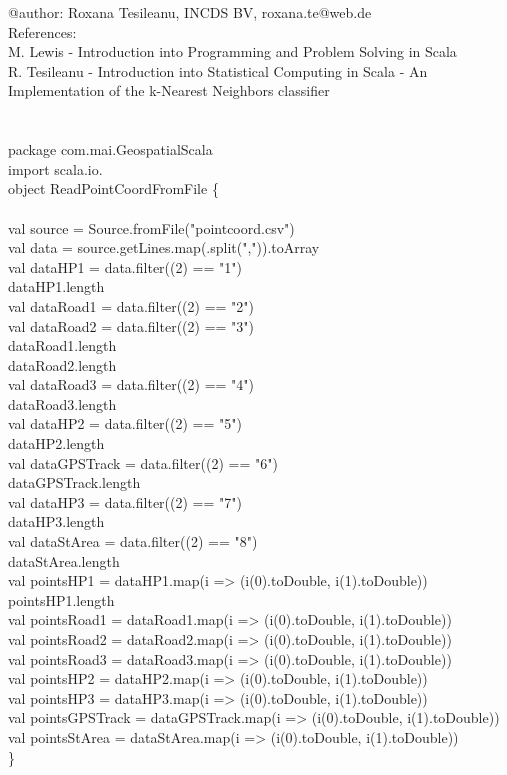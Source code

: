 \documentclass {article}
\begin{document}
\begin{appendices}
@author: Roxana Tesileanu, INCDS BV, roxana.te@web.de\\
References:\\ 
M. Lewis - Introduction into Programming and Problem Solving in Scala\\
R. Tesileanu - Introduction into Statistical Computing in Scala - An Implementation of the k-Nearest Neighbors classifier\\
\\
\\
package com.mai.GeospatialScala\\
import scala.io.\underline{\space}\\
object ReadPointCoordFromFile \{ 
\\
\\
val source = Source.fromFile("pointcoord.csv")\\
val data = source.getLines.map(\underline{\space}.split(",")).toArray\\
val dataHP1 = data.filter(\underline{\space}(2) == "1")\\
dataHP1.length\\
val dataRoad1 = data.filter(\underline{\space}(2) == "2")\\
val dataRoad2 = data.filter(\underline{\space}(2) == "3")\\
dataRoad1.length\\
dataRoad2.length\\
val dataRoad3 = data.filter(\underline{\space}(2) == "4")\\
dataRoad3.length\\
val dataHP2 = data.filter(\underline{\space}(2) == "5")\\
dataHP2.length\\
val dataGPSTrack = data.filter(\underline{\space}(2) == "6")\\
dataGPSTrack.length\\
val dataHP3 = data.filter(\underline{\space}(2) == "7")\\
dataHP3.length\\
val dataStArea =  data.filter(\underline{\space}(2) == "8")\\
dataStArea.length\\
val pointsHP1 = dataHP1.map(i => (i(0).toDouble, i(1).toDouble))\\
pointsHP1.length\\
val pointsRoad1 = dataRoad1.map(i => (i(0).toDouble, i(1).toDouble))\\
val pointsRoad2 = dataRoad2.map(i => (i(0).toDouble, i(1).toDouble))\\
val pointsRoad3 = dataRoad3.map(i => (i(0).toDouble, i(1).toDouble))\\
val pointsHP2 = dataHP2.map(i => (i(0).toDouble, i(1).toDouble))\\
val pointsHP3 = dataHP3.map(i => (i(0).toDouble, i(1).toDouble)) \\
val pointsGPSTrack = dataGPSTrack.map(i => (i(0).toDouble, i(1).toDouble))\\
val pointsStArea = dataStArea.map(i => (i(0).toDouble, i(1).toDouble))\\
\}
\\
\\


\end{appendices}
\end{document}
